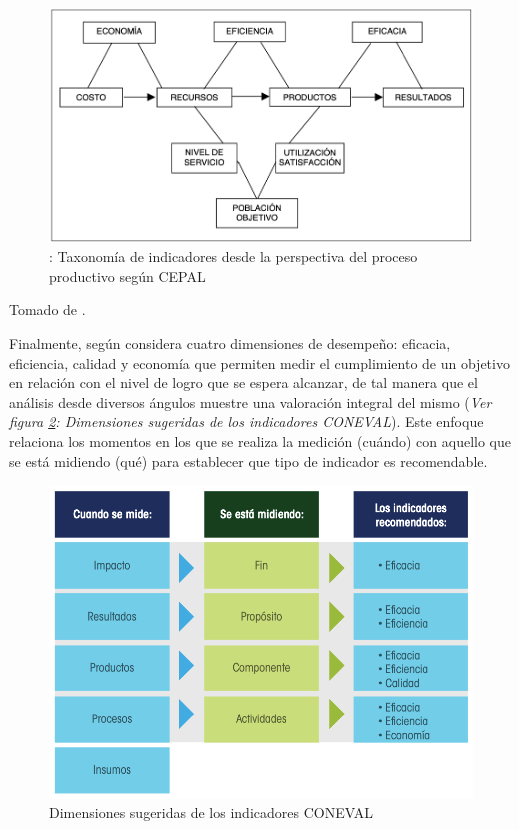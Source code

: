 \documentclass[
]{book}
\begin{document}
\begin{figure}

{\centering \includegraphics[width=0.7\linewidth]{Imagenes/figura_8} 

}

\caption{: Taxonomía de indicadores desde la perspectiva del proceso productivo según CEPAL}\label{fig:figura8}
\end{figure}

Tomado de \citet{bonnefoy2005indicadores}.

Finalmente, según \citet{coneval2013manual} considera cuatro dimensiones de desempeño: eficacia, eficiencia, calidad y economía que permiten medir el cumplimiento de un objetivo en relación con el nivel de logro que se espera alcanzar, de tal manera que el análisis desde diversos ángulos muestre una valoración integral del mismo (\emph{Ver figura \ref{fig:figura9}: Dimensiones sugeridas de los indicadores CONEVAL}). Este enfoque relaciona los momentos en los que se realiza la medición (cuándo) con aquello que se está midiendo (qué) para establecer que tipo de indicador es recomendable.

\begin{figure}

{\centering \includegraphics[width=0.7\linewidth]{Imagenes/figura_9} 

}

\caption{ Dimensiones sugeridas de los indicadores CONEVAL}\label{fig:figura9}
\end{figure}
\end{document}
